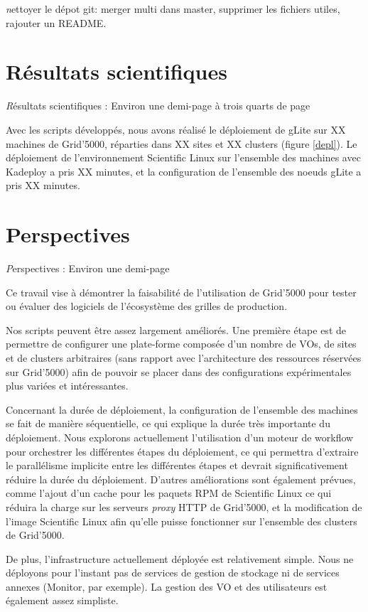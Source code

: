 \documentclass[a4paper,11pt]{article}
\newcommand{\todo}[1]{{\color{red}\textsl #1}}
\begin{document}
\todo{nettoyer le dépot git: merger multi dans master, supprimer les fichiers utiles, rajouter un README.}

\section{Résultats scientifiques}
\todo{Résultats scientifiques : Environ une demi-page à trois quarts de page}

Avec les scripts développés, nous avons réalisé le déploiement de gLite sur XX
machines de Grid'5000, réparties dans XX sites et XX clusters (figure
\ref{depl}). Le déploiement de l'environnement Scientific Linux sur l'ensemble
des machines avec Kadeploy a pris XX minutes, et la configuration de l'ensemble
des noeuds gLite a pris XX minutes.

\section{Perspectives}
\todo{Perspectives : Environ une demi-page}

Ce travail vise à démontrer la faisabilité de l'utilisation de Grid'5000 pour
tester ou évaluer des logiciels de l'écosystème des grilles de production.

Nos scripts peuvent être assez largement améliorés. Une première étape est de
permettre de configurer une plate-forme composée d'un nombre de VOs, de sites
et de clusters arbitraires (sans rapport avec l'architecture des ressources
réservées sur Grid'5000) afin de pouvoir se placer dans des configurations
expérimentales plus variées et intéressantes.

Concernant la durée de déploiement, la configuration de l'ensemble des machines
se fait de manière séquentielle, ce qui explique la durée très importante du
déploiement. Nous explorons actuellement l'utilisation d'un moteur de workflow
pour orchestrer les différentes étapes du déploiement, ce qui permettra
d'extraire le parallélisme implicite entre les différentes étapes et devrait
significativement réduire la durée du déploiement. D'autres améliorations sont
également prévues, comme l'ajout d'un cache pour les paquets RPM de Scientific
Linux ce qui réduira la charge sur les serveurs \textsl{proxy} HTTP de
Grid'5000, et la modification de l'image Scientific Linux afin qu'elle puisse
fonctionner sur l'ensemble des clusters de Grid'5000.

De plus, l'infrastructure actuellement déployée est relativement simple. Nous
ne déployons pour l'instant pas de services de gestion de stockage ni de
services annexes (Monitor, par exemple). La gestion des VO et des utilisateurs
est également assez simpliste.
\end{document}
